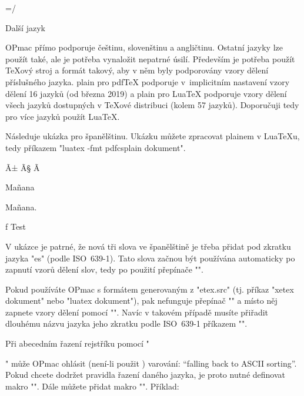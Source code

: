 \begtt
\footline={\hss \rm \thefontsize[10]\the\pageno/\the\lastpage \hss}
\endtt


\sec Další jazyk

OPmac přímo podporuje češtinu, slovenštinu a angličtinu. Ostatní jazyky lze
použít také, ale je potřeba vynaložit nepatrné úsilí. Především je potřeba
použít \TeX{}ový stroj a formát takový, aby v něm byly podporovány vzory
dělení příslušného jazyka. \CS{}plain pro pdf\TeX{} podporuje v~implicitním
nastavení vzory dělení 16 jazyků (od března 2019) a \CS{}plain pro Lua\TeX{}
podporuje vzory dělení všech jazyků dostupných v \TeX{}ové distribuci (kolem
57 jazyků). Doporučuji tedy pro více jazyků použít Lua\TeX{}.

Následuje ukázka pro španělštinu. Ukázku můžete zpracovat \CS{}plainem v
Lua\TeX{}u, tedy příkazem
"luatex -fmt pdfcsplain dokument".

\mubyte \ntie ^^c3^^b1\endmubyte \def\ntie{\~n}
\mubyte \ccedilla ^^c3^^a7\endmubyte \def\ccedilla{\c c}
\mubyte \Ccedilla ^^c3^^87\endmubyte \def\Ccedilla{\c C}

\begtt



\eslang %

\sec Mañana

Mañana.

\caption/f Test %

\bye
\endtt

V ukázce je patrné, že nová tři slova ve španělštině je třeba přidat pod
zkratku jazyka "es" (podle ISO~639-1). Tato slova začnou být používána automaticky
po zapnutí vzorů dělení slov, tedy po použití přepínače "\eslang".

Pokud používáte OPmac s formátem generovaným z "etex.src" (tj. příkaz 
"xetex dokument" nebo "luatex dokument"), pak nefunguje přepínač "\eslang" a
místo něj zapnete vzory dělení pomocí "".
Navíc v takovém případě musíte přiřadit dlouhému názvu jazyka jeho zkratku podle
ISO~639-1 příkazem "".

Při abecedním řazení rejstříku pomocí "\makeindex" může OPmac ohlásit
(není-li použit \csplain) varování: ``falling back to ASCII sorting''.
Pokud chcete dodržet pravidla řazení daného jazyka, je proto nutné definovat makro 
"". Dále můžete přidat makro
"". Příklad:

